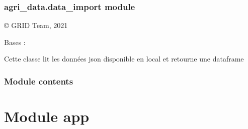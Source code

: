 \documentclass[letterpaper,10pt,french]{sphinxmanual}
\begin{document}
\subsubsection{agri\_data.data\_import module}
\label{\detokenize{agri_data:module-agri_data.data_import}}\label{\detokenize{agri_data:agri-data-data-import-module}}
\sphinxAtStartPar
© GRID Team, 2021

\begin{fulllineitems}
\label{\detokenize{agri_data:agri_data.data_import.ReadData}}
\sphinxAtStartPar
Bases : 

\sphinxAtStartPar
Cette classe lit les données json disponible en local et retourne une dataframe

\begin{fulllineitems}
\label{\detokenize{agri_data:agri_data.data_import.ReadData.read_json}}
\end{fulllineitems}


\end{fulllineitems}



\subsubsection{Module contents}
\label{\detokenize{agri_data:module-agri_data}}\label{\detokenize{agri_data:module-contents}}

\section{Module app}
\label{\detokenize{app:module-app}}\label{\detokenize{app:app}}\label{\detokenize{app::doc}}
\end{document}
